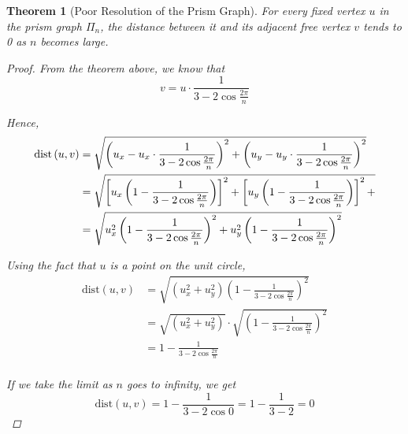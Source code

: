 \documentclass[11pt]{report}
\newcommand{\dist}[2]{\text{dist}\left({#1, #2}\right)}
\newtheorem{theorem}{Theorem}[section]
\begin{document}
\begin{theorem}[Poor Resolution of the Prism Graph]
    For every fixed vertex $u$ in the prism graph $\Pi_{n}$, the distance between it and its adjacent free vertex $v$ tends to 0 as $n$ becomes large.

    \begin{proof}
        From the theorem above, we know that
        \[ v = u \cdot \frac{1}{3 -2\cos{\frac{2\pi}{n}}} \]
        
        Hence,
        \[
        \begin{aligned}
        \dist{u}{v} &= \sqrt{
            \left(u_x - u_x \cdot \frac{1}{3 -2\cos{\frac{2\pi}{n}}}
            \right)^2 +
            \left(u_y - u_y \cdot \frac{1}{3 -2\cos{\frac{2\pi}{n}}}
            \right)^2
            } \\
            &= \sqrt{
            \left[u_x
                \left(1 - \frac{1}{3 -2\cos{\frac{2\pi}{n}}} \right)
            \right]^2 +
            \left[u_y
                \left(1 - \frac{1}{3 -2\cos{\frac{2\pi}{n}}} \right)
            \right]^2 +
            } \\
            &= \sqrt{
            u_x^2
            \left(1 - \frac{1}{3 -2\cos{\frac{2\pi}{n}}} \right)^2 +
            u_y^2
            \left(1 - \frac{1}{3 -2\cos{\frac{2\pi}{n}}} \right)^2 } \\
        \end{aligned}
        \]
        
        Using the fact that $u$ is a point on the unit circle,
        \[
        \begin{aligned}
            \dist{u}{v} &= \sqrt{
                \left( u_x^2 + u_y^2 \right)
                \left(1 - \frac{1}{3 -2\cos{\frac{2\pi}{n}}} \right)^2
            } \\
            &= \sqrt{\left( u_x^2 + u_y^2 \right)} \cdot
               \sqrt{\left(1 - \frac{1}{3 -2\cos{\frac{2\pi}{n}}} \right)^2} \\
            &= 1 - \frac{1}{3 - 2\cos{\frac{2\pi}{n}}} \\
        \end{aligned}
        \]
        
        If we take the limit as $n$ goes to infinity, we get
        \[
        \dist{u}{v} = 1 - \frac{1}{3 - 2\cos{0}} = 1 - \frac{1}{3 - 2} = 0
        \]
    \end{proof}
\end{theorem}
\end{document}
